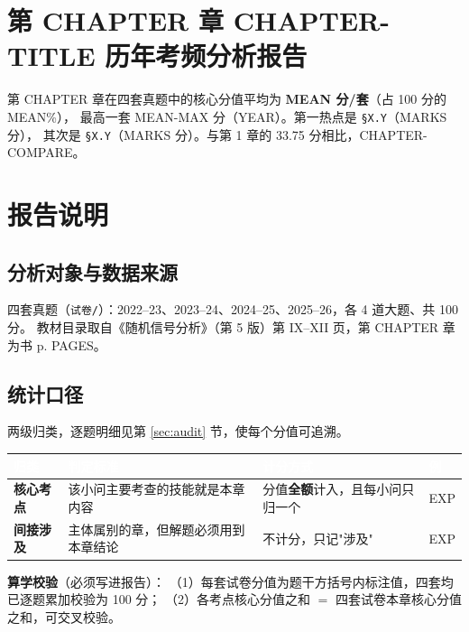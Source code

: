 \documentclass[11pt]{ctexart}
\newcommand{\secode}[1]{\texttt{\color{deepblue}#1}}
\newcommand{\code}[1]{\texttt{\small #1}}
\newcommand{\thd}[1]{\textcolor{white}{\bfseries #1}}
\begin{document}
\section*{第 CHAPTER 章 CHAPTER-TITLE 历年考频分析报告}

\begin{warnbox}[title={一句话结论}]
第 CHAPTER 章在四套真题中的核心分值平均为 \textbf{MEAN 分/套}（占 100 分的 MEAN\%），
最高一套 MEAN-MAX 分（YEAR）。第一热点是 \secode{§X.Y}（MARKS 分），
其次是 \secode{§X.Y}（MARKS 分）。与第 1 章的 33.75 分相比，CHAPTER-COMPARE。
\end{warnbox}

\section{报告说明}

\subsection{分析对象与数据来源}
四套真题（\code{试卷/}）：2022--23、2023--24、2024--25、2025--26，各 4 道大题、共 100 分。
教材目录取自《随机信号分析》（第 5 版）第 IX--XII 页，第 CHAPTER 章为书 p. PAGES。

\subsection{统计口径}
两级归类，逐题明细见第 \ref{sec:audit} 节，使每个分值可追溯。
\begin{center}
\renewcommand{\arraystretch}{1.35}
\begin{tabularx}{\textwidth}{@{}L{2.6cm}L{5.0cm}L{4.2cm}X@{}}
\toprule
{}\thd{归类} & \thd{判定标准} & \thd{计分方式} & \thd{例} \\
\midrule
\textbf{核心考点} & 该小问主要考查的技能就是本章内容 & 分值\textbf{全额}计入，且每小问只归一个 & EXP \\
\textbf{间接涉及} & 主体属别的章，但解题必须用到本章结论 & 不计分，只记"涉及" & EXP \\
\bottomrule
\end{tabularx}
\end{center}

\noindent\textbf{算学校验}（必须写进报告）：
（1）每套试卷分值为题干方括号内标注值，四套均已逐题累加校验为 100 分；
（2）各考点核心分值之和 $=$ 四套试卷本章核心分值之和，可交叉校验。
\end{document}
